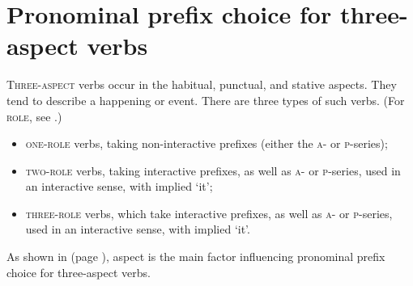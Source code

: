 \chapter{Pronominal prefix choice for three-aspect verbs} \label{Pronominal prefix choice for three-aspect verbs}
\textsc{Three-aspect} verbs occur in the habitual, punctual, and stative aspects. They tend to describe a happening or event. There are three types of such verbs. (For \textsc{role}, see .)

\begin{itemize}
    \item \textsc{one-role} verbs, taking non-interactive prefixes (either the \textsc{a}- or \textsc{p}-series);
    \item \textsc{two-role} verbs, taking interactive prefixes, as well as \textsc{a}- or \textsc{p}-series, used in an interactive sense, with implied ‘it’;
    \item \textsc{three-role} verbs, which take interactive prefixes, as well as \textsc{a}- or \textsc{p}-series, used in an interactive sense, with implied ‘it’.
\end{itemize} 

As shown in  (page \pageref{figtab:1:ppthreeaspv}), aspect is the main factor influencing pronominal prefix choice for three-aspect verbs. 

